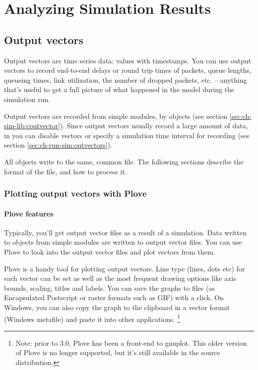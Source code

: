 \chapter{Analyzing Simulation Results}
\label{cha:analyzing-simulation-results}


\section{Output vectors}
\label{sec:ch-ana-sim:output-vectors}

Output vectors are time series data: values with timestamps.
You can use output vectors to record end-to-end delays or
round trip times of packets, queue lengths, queueing times,
link utilization, the number of dropped packets, etc. --
anything that's useful to get a full picture of what happened
in the model during the simulation run.

Output vectors are recorded from simple modules, by  objects
(see section \ref{sec:ch-sim-lib:coutvector}). Since output vectors usually
record a large amount of data, in  you can disable vectors
or specify a simulation time interval for recording
(see section \ref{sec:ch-run-sim:outvectors}).

All  objects write to the same, common file.
The following sections describe the format of the file, and
how to process it.


\subsection{Plotting output vectors with Plove}

\subsubsection{Plove features}

Typically, you'll get output vector files as a result of a simulation.
Data written to  objects from
simple modules are written to output vector
files. You can use Plove to look
into the output vector files and plot vectors from them.

Plove is a handy tool for plotting
{\opp} output vectors. Line type (lines, dots etc) for each vector can be set
as well as the most frequent drawing options like axis bounds, scaling, titles
and labels. You can save the graphs to files (as Encapsulated Postscript or
raster formats such as GIF) with a click. On Windows, you can also
copy the graph to the clipboard in a vector format (Windows metafile)
and paste it into other applications.
    \footnote{Note: prior to {\opp} 3.0, Plove has been a front-end to
    gnuplot. This older version of Plove is no longer supported, but it's still
    available in the {\opp} source distribution.}

